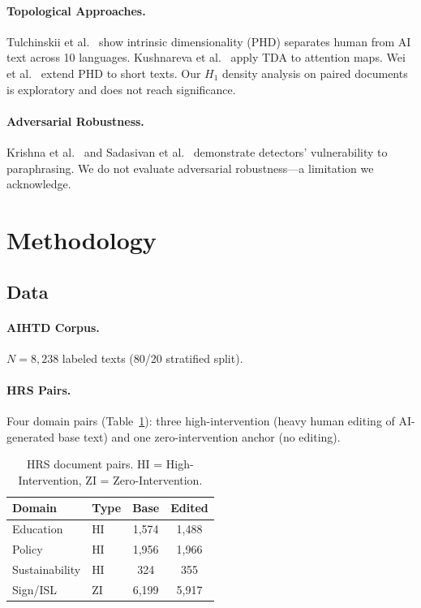 \documentclass[11pt]{article}
\begin{document}
\paragraph{Topological Approaches.}
Tulchinskii et al.~\cite{tulchinskii2024intrinsic} show intrinsic dimensionality (PHD) separates human from AI text across 10 languages. Kushnareva et al.~\cite{kushnareva2023artificial} apply TDA to attention maps. Wei et al.~\cite{wei2025shortphd} extend PHD to short texts. Our $H_1$ density analysis on paired documents is exploratory and does not reach significance.

\paragraph{Adversarial Robustness.}
Krishna et al.~\cite{krishna2024paraphrasing} and Sadasivan et al.~\cite{sadasivan2023reliable,sadasivan2025adversarial} demonstrate detectors' vulnerability to paraphrasing. We do not evaluate adversarial robustness---a limitation we acknowledge.

\section{Methodology}

\subsection{Data}

\paragraph{AIHTD Corpus.} $N = 8{,}238$ labeled texts (80/20 stratified split).

\paragraph{HRS Pairs.} Four domain pairs (Table~\ref{tab:pairs}): three high-intervention (heavy human editing of AI-generated base text) and one zero-intervention anchor (no editing).

\begin{table}[t]
\centering
\small
\caption{HRS document pairs. HI = High-Intervention, ZI = Zero-Intervention.}
\label{tab:pairs}
\begin{tabular}{@{}llcc@{}}
\toprule
\textbf{Domain} & \textbf{Type} & \textbf{Base} & \textbf{Edited} \\
\midrule
Education      & HI   & 1{,}574 & 1{,}488 \\
Policy         & HI   & 1{,}956 & 1{,}966 \\
Sustainability & HI   & 324     & 355     \\
Sign/ISL       & ZI   & 6{,}199 & 5{,}917 \\
\bottomrule
\end{tabular}
\end{table}
\end{document}
